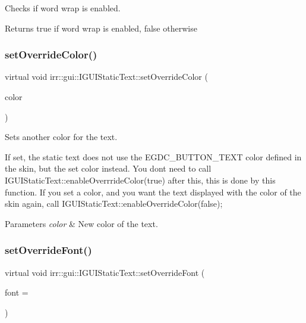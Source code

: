 Checks if word wrap is enabled. 

\begin{DoxyReturn}{Returns}
true if word wrap is enabled, false otherwise 
\end{DoxyReturn}
\mbox{\label{classirr_1_1gui_1_1IGUIStaticText_aadc1f0e10e4b298944e6dcfd49e54009}} 
\subsubsection{\texorpdfstring{set\+Override\+Color()}{setOverrideColor()}}
{\footnotesize\ttfamily virtual void irr\+::gui\+::\+I\+G\+U\+I\+Static\+Text\+::set\+Override\+Color (\begin{DoxyParamCaption}\item[{\hyperlink{classirr_1_1video_1_1SColor}{video\+::\+S\+Color}}]{color }\end{DoxyParamCaption})\hspace{0.3cm}{\ttfamily [pure virtual]}}



Sets another color for the text. 

If set, the static text does not use the E\+G\+D\+C\+\_\+\+B\+U\+T\+T\+O\+N\+\_\+\+T\+E\+XT color defined in the skin, but the set color instead. You don\textquotesingle{}t need to call I\+G\+U\+I\+Static\+Text\+::enable\+Overrride\+Color(true) after this, this is done by this function. If you set a color, and you want the text displayed with the color of the skin again, call I\+G\+U\+I\+Static\+Text\+::enable\+Override\+Color(false); 
\begin{DoxyParams}{Parameters}
{\em color} & New color of the text. \\
\hline
\end{DoxyParams}
\mbox{\label{classirr_1_1gui_1_1IGUIStaticText_ae3f65780d10979eb323ee7310cff7396}} 
\subsubsection{\texorpdfstring{set\+Override\+Font()}{setOverrideFont()}}
{\footnotesize\ttfamily virtual void irr\+::gui\+::\+I\+G\+U\+I\+Static\+Text\+::set\+Override\+Font (\begin{DoxyParamCaption}\item[{\hyperlink{classirr_1_1gui_1_1IGUIFont}{I\+G\+U\+I\+Font} $\ast$}]{font = {} }\end{DoxyParamCaption})\hspace{0.3cm}{\ttfamily [pure virtual]}}



